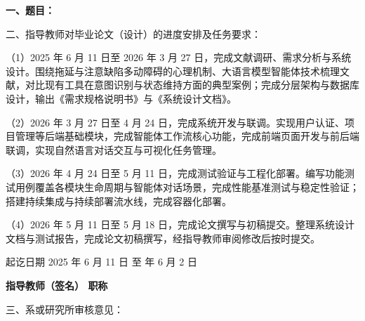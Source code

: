 \cleardoublepage{}

{
    \bfseries
    \noindent 一、题目：\uline{\hfill \Title \hfill}

    \noindent 二、指导教师对毕业论文（设计）的进度安排及任务要求：

    \setlength{\parindent}{2em}

    \par （1）2025 年 6 月 11 日至 2026 年 3 月 27 日，完成文献调研、需求分析与系统设计。围绕拖延与注意缺陷多动障碍的心理机制、大语言模型智能体技术梳理文献，对比现有工具在意图识别与状态维持方面的典型案例；完成分层架构与数据库设计，输出《需求规格说明书》与《系统设计文档》。

    \par （2）2026 年 3 月 27 日至 4 月 24 日，完成系统开发与联调。实现用户认证、项目管理等后端基础模块，完成智能体工作流核心功能，完成前端页面开发与前后端联调，实现自然语言对话交互与可视化任务管理。

    \par （3）2026 年 4 月 24 日至 5 月 11 日，完成测试验证与工程化部署。编写功能测试用例覆盖各模块生命周期与智能体对话场景，完成性能基准测试与稳定性验证；搭建持续集成与持续部署流水线，完成容器化部署。

    \par （4）2026 年 5 月 11 日至 5 月 18 日，完成论文撰写与初稿提交。整理系统设计文档与测试报告，完成论文初稿撰写，经指导教师审阅修改后按时提交。

    \bigskip

    \noindent 起讫日期 2025 年 6 月 11 日 \quad 至  年 6 月 2 日
    \begin{flushright}
        \bfseries {}
            指导教师（签名） \underline{} 职称 \underline{}
    \end{flushright}

    \noindent 三、系或研究所审核意见：\\

    \mbox{} \vfill
    \signature{负责人（签名）}
}
